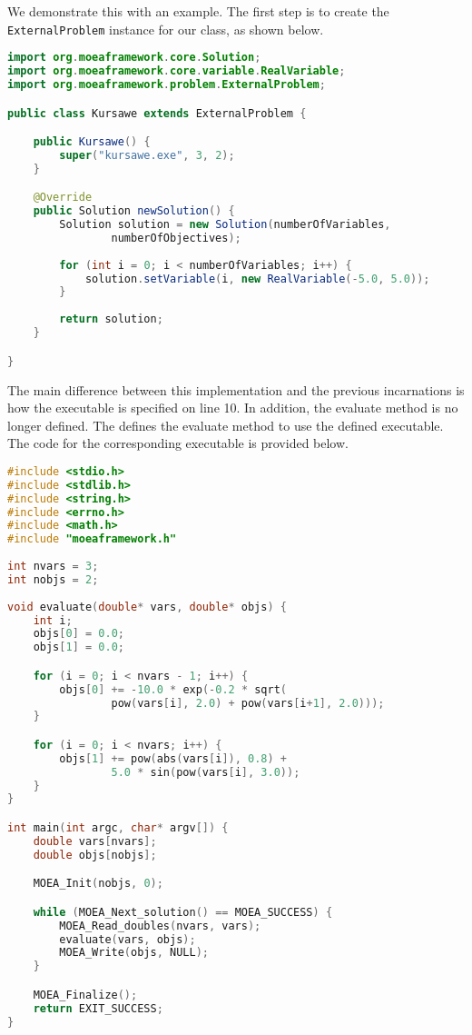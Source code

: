 We demonstrate this with an example.  The first step is to create the \texttt{ExternalProblem} instance for our class, as shown below.

\begin{lstlisting}[language=Java]
import org.moeaframework.core.Solution;
import org.moeaframework.core.variable.RealVariable;
import org.moeaframework.problem.ExternalProblem;

public class Kursawe extends ExternalProblem {

	public Kursawe() {
		super("kursawe.exe", 3, 2);
	}

	@Override
	public Solution newSolution() {
		Solution solution = new Solution(numberOfVariables, 
				numberOfObjectives);
 
		for (int i = 0; i < numberOfVariables; i++) {
			solution.setVariable(i, new RealVariable(-5.0, 5.0));
		}
 
		return solution;
	}

}
\end{lstlisting}

The main difference between this implementation and the previous incarnations is how the executable is specified on line 10.  In addition, the evaluate method is no longer defined.  The  defines the evaluate method to use the defined executable.  The code for the corresponding executable is provided below.

\begin{lstlisting}[language=C]
#include <stdio.h>
#include <stdlib.h>
#include <string.h>
#include <errno.h>
#include <math.h>
#include "moeaframework.h"
 
int nvars = 3;
int nobjs = 2;
 
void evaluate(double* vars, double* objs) {
	int i;
	objs[0] = 0.0;
	objs[1] = 0.0;

	for (i = 0; i < nvars - 1; i++) {
		objs[0] += -10.0 * exp(-0.2 * sqrt(
				pow(vars[i], 2.0) + pow(vars[i+1], 2.0)));
	}

	for (i = 0; i < nvars; i++) {
		objs[1] += pow(abs(vars[i]), 0.8) +  
				5.0 * sin(pow(vars[i], 3.0));
	}
}

int main(int argc, char* argv[]) {
	double vars[nvars];
	double objs[nobjs];

	MOEA_Init(nobjs, 0);

	while (MOEA_Next_solution() == MOEA_SUCCESS) {
		MOEA_Read_doubles(nvars, vars);
		evaluate(vars, objs);
		MOEA_Write(objs, NULL);
	}

	MOEA_Finalize();
	return EXIT_SUCCESS;
}
\end{lstlisting}

